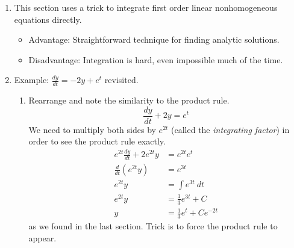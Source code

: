 \documentclass{article}
\newcommand{\ds}{\displaystyle}
\begin{document}
\begin{enumerate}

\item This section uses a trick to integrate first order linear nonhomogeneous equations directly. 
\begin{itemize}
\item Advantage: Straightforward technique for finding analytic solutions.
\item Disadvantage: Integration is hard, even impossible much of the time.
\end{itemize}

\item Example: $\ds \frac{dy}{dt} = -2y + e^t$ revisited.
\begin{enumerate}
\item Rearrange and note the similarity to the product rule. 
\[
\frac{dy}{dt} + 2y = e^t
\]
We need to multiply both sides by $e^{2t}$ (called the \emph{integrating factor}) in order to see the product rule exactly.
\begin{align*}
e^{2t}\frac{dy}{dt} + 2e^{2t}y &= e^{2t}e^t \\
\frac{d}{dt}\left(e^{2t}y\right) &= e^{3t} \\
e^{2t}y &= \int e^{3t} ~dt \\
e^{2t}y &= \frac{1}{3} e^{3t} + C \\
y &= \frac{1}{3} e^{t} + Ce^{-2t} 
\end{align*}
as we found in the last section. Trick is to force the product rule to appear.
\end{enumerate}


\end{enumerate}
\end{document}
